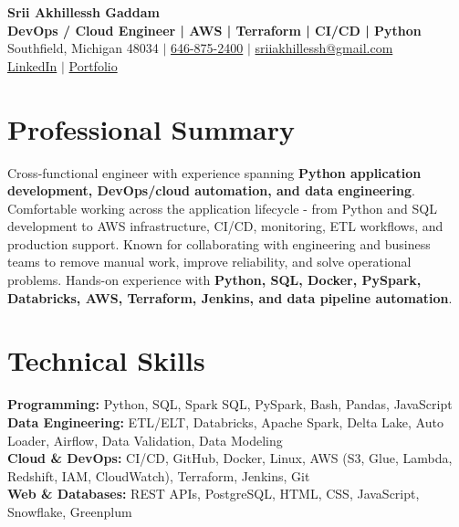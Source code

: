 \documentclass[letterpaper,10pt]{article}
\begin{document}
\fontsize{9.35pt}{10.45pt}\selectfont

\begin{center}
    {\LARGE \textbf{Srii Akhillessh Gaddam}} \\[-1pt]
    \textbf{DevOps / Cloud Engineer | AWS | Terraform | CI/CD | Python} \\[2pt]
    Southfield, Michigan 48034 $|$
    \href{tel:6468752400}{646-875-2400} $|$
    \href{mailto:sriiakhillessh@gmail.com}{sriiakhillessh@gmail.com} \\[1pt]
    \href{https://www.linkedin.com/in/srii-akhiilessh-gaddam-b48668191/}{LinkedIn} $|$
    \href{https://sriiakhillesshg.github.io/portfolio/}{Portfolio}
\end{center}
\vspace{-8pt}

\section{Professional Summary}
\small{Cross-functional engineer with experience spanning \textbf{Python application development, DevOps/cloud automation, and data engineering}. Comfortable working across the application lifecycle - from Python and SQL development to AWS infrastructure, CI/CD, monitoring, ETL workflows, and production support. Known for collaborating with engineering and business teams to remove manual work, improve reliability, and solve operational problems. Hands-on experience with \textbf{Python, SQL, Docker, PySpark, Databricks, AWS, Terraform, Jenkins, and data pipeline automation}.}

\section{Technical Skills}
\small{
\textbf{Programming:} Python, SQL, Spark SQL, PySpark, Bash, Pandas, JavaScript \\
\textbf{Data Engineering:} ETL/ELT, Databricks, Apache Spark, Delta Lake, Auto Loader, Airflow, Data Validation, Data Modeling \\
\textbf{Cloud \& DevOps:} CI/CD, GitHub, Docker, Linux, AWS (S3, Glue, Lambda, Redshift, IAM, CloudWatch), Terraform, Jenkins, Git \\
\textbf{Web \& Databases:} REST APIs, PostgreSQL, HTML, CSS, JavaScript, Snowflake, Greenplum
}
\end{document}
